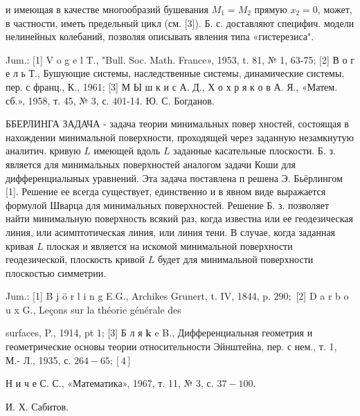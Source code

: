 \documentclass[10pt]{article}
\begin{document}
и имеющая в качестве многообразий бушевания $M_{1}=M_{2}$ прямую $x_{2}=0$, может, в частности, иметь предельный цикл (см. [3]). Б. с. доставляют специфич. модели нелинейных колебаний, позволяя описывать явления типа «гистерезиса".



Jum.: [1] V o g e l T., "Bull. Soc. Math. France», 1953, t. 81, № 1, 63-75; [2] В о г е л ь Т., Бушующие системы, наследственные системы, динамические системы, пер. с франц., К., 1961; [3] М Ы ш к и с А. Д., Х о х р я к о в А. Я., «Матем. сб.», 1958, т. 45, № 3, с. 401-14. Ю. С. Богданов.



ББЕРЛИНГА ЗАДАЧА - задача теории минимальных повер хностей, состоящая в нахождении минимальной поверхности, проходящей через заданную незамкнутую аналитич. кривую $L$ имеющей вдоль $L$ заданные касательные плоскости. Б. з. является для минимальных поверхностей аналогом задачи Коши для дифференциалыных уравнений. Эта задача поставлена п решена Э. Бьёрлингом [1]. Решение ее всегда существует, единственно и в явном виде выражается формулой Шварца для минимальных поверхностей. Решение Б. з. позволяет найти минимальную поверхность всякий раз, когда известна или ее геодезическая линия, или асимптотическая линия, или линия тени. В случае, когда заданная кривая $L$ плоская и является на искомой минимальной поверхности геодезической, плоскость кривой $L$ будет для минимальной поверхности плоскостью симметрии.



Jum.: [1] B j ö r l i n g E.G., Archikes Grunert, t. IV, 1844, p. $290 ;$ [2] D a r b o u x G., Leçons sur la théorie générale des

surfaces, P., 1914, pt 1; [3] Б л я $\mathbf{k}$ e B., Дифференциальная геометрия и геометрические основы теории относительности Эйнштейна, пер. с нем., т. 1, М.- Л., 1935, с. $264-65 ;[4]$

Н и ч е С. С., «Математика», 1967, т. 11, № 3, с. $37-100$.



И. Х. Сабитов.
\end{document}
